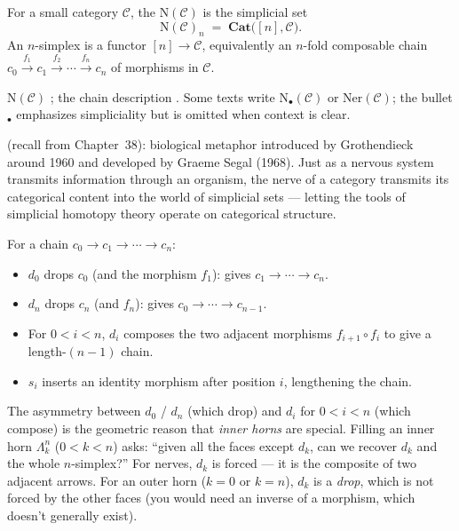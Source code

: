 \begin{definition}
\label{def:nerve}
For a small category $\mathcal{C}$, the  $\mathrm{N}(\mathcal{C})$
is the simplicial set
\begin{equation*}
  \mathrm{N}(\mathcal{C})_n \;=\; \mathbf{Cat}\bigl([n], \mathcal{C}\bigr).
\end{equation*}
An $n$-simplex is a functor $[n] \to \mathcal{C}$, equivalently an $n$-fold
composable chain $c_0 \xrightarrow{f_1} c_1 \xrightarrow{f_2} \cdots
\xrightarrow{f_n} c_n$ of morphisms in $\mathcal{C}$.
\end{definition}

\begin{howtosay}
$\mathrm{N}(\mathcal{C})$ ; the
chain description . Some texts write $\mathrm{N}_\bullet(\mathcal{C})$ or
$\mathrm{Ner}(\mathcal{C})$; the bullet ${}_\bullet$ emphasizes
simpliciality but is omitted when context is clear.
\end{howtosay}

\begin{nameorigin}
 (recall from Chapter~38): biological metaphor introduced by
Grothendieck around 1960 and developed by Graeme Segal (1968). Just as
a nervous system transmits information through an organism, the nerve of
a category transmits its categorical content into the world of
simplicial sets — letting the tools of simplicial homotopy theory
operate on categorical structure.
\end{nameorigin}

\begin{remark}
For a chain $c_0 \to c_1 \to \cdots \to c_n$:
\begin{itemize}
  \item $d_0$ drops $c_0$ (and the morphism $f_1$): gives $c_1 \to \cdots
        \to c_n$.
  \item $d_n$ drops $c_n$ (and $f_n$): gives $c_0 \to \cdots \to c_{n-1}$.
  \item For $0 < i < n$, $d_i$ composes the two adjacent morphisms
        $f_{i+1} \circ f_i$ to give a length-$(n-1)$ chain.
  \item $s_i$ inserts an identity morphism after position $i$, lengthening
        the chain.
\end{itemize}
\end{remark}

\begin{readernote}
The asymmetry between $d_0$ / $d_n$ (which drop) and $d_i$ for $0 < i < n$
(which compose) is the geometric reason that \emph{inner horns} are
special. Filling an inner horn $\Lambda^n_k$ ($0 < k < n$) asks: ``given
all the faces except $d_k$, can we recover $d_k$ and the whole
$n$-simplex?'' For nerves, $d_k$ is forced — it is the composite of two
adjacent arrows. For an outer horn ($k = 0$ or $k = n$), $d_k$ is a
\emph{drop}, which is not forced by the other faces (you would need an
inverse of a morphism, which doesn't generally exist).
\end{readernote}

